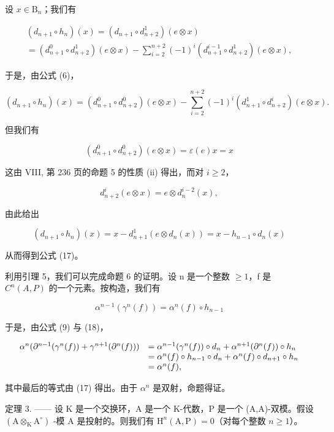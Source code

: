 设 \(x\in \mathrm{B}_n\)；我们有

\[
\begin{array}{c} (d _ {n + 1} \circ h _ {n}) (x) = (d _ {n + 1} \circ d _ {n + 2} ^ {1}) (e \otimes x) \\ = (d _ {n + 1} ^ {0} \circ d _ {n + 2} ^ {1}) (e \otimes x) - \sum_ {i = 2} ^ {n + 2} (- 1) ^ {i} (d _ {n + 1} ^ {i - 1} \circ d _ {n + 2} ^ {1}) (e \otimes x), \end{array}
\]

于是，由公式 (6)，

\[
(d _ {n + 1} \circ h _ {n}) (x) = (d _ {n + 1} ^ {0} \circ d _ {n + 2} ^ {0}) (e \otimes x) - \sum_ {i = 2} ^ {n + 2} (- 1) ^ {i} (d _ {n + 1} ^ {1} \circ d _ {n + 2} ^ {i}) (e \otimes x).
\]

但我们有

\[
(d _ {n + 1} ^ {0} \circ d _ {n + 2} ^ {0}) (e \otimes x) = \varepsilon (e) x = x
\]

这由 VIII, 第 236 页的命题 5 的性质 (ii) 得出，而对 \(i \geqslant 2\)，

\[
d _ {n + 2} ^ {i} (e \otimes x) = e \otimes d _ {n} ^ {i - 2} (x),
\]

由此给出

\[
(d _ {n + 1} \circ h _ {n}) (x) = x - d _ {n + 1} ^ {1} (e \otimes d _ {n} (x)) = x - h _ {n - 1} \circ d _ {n} (x)
\]

从而得到公式 (17)。

利用引理 5，我们可以完成命题 6 的证明。设 n 是一个整数 \(\geqslant 1\)，f 是 \(C^{n}(A,P)\) 的一个元素。按构造，我们有

\[
\alpha^ {n - 1} (\gamma^ {n} (f)) = \alpha^ {n} (f) \circ h _ {n - 1}\tag{18}
\]

于是，由公式 (9) 与 (18)，

\[
\begin{array}{r l} \alpha^ {n} (\partial^ {n - 1} (\gamma^ {n} (f)) + \gamma^ {n + 1} (\partial^ {n} (f))) & = \alpha^ {n - 1} (\gamma^ {n} (f)) \circ d _ {n} + \alpha^ {n + 1} (\partial^ {n} (f)) \circ h _ {n} \\ & = \alpha^ {n} (f) \circ h _ {n - 1} \circ d _ {n} + \alpha^ {n} (f) \circ d _ {n + 1} \circ h _ {n} \\ & = \alpha^ {n} (f), \end{array}
\]

其中最后的等式由 (17) 得出。由于 \(\alpha^{n}\) 是双射，命题得证。

定理 3. —— 设 K 是一个交换环，A 是一个 K-代数，P 是一个 (A,A)-双模。假设 \((\mathrm{A}\otimes_{\mathrm{K}}\mathrm{A}^{\circ})\) -模 A 是投射的。则我们有 \(\mathrm{H}^{n}(\mathrm{A},\mathrm{P})=0\)（对每个整数 \(n\geqslant1\)）。

